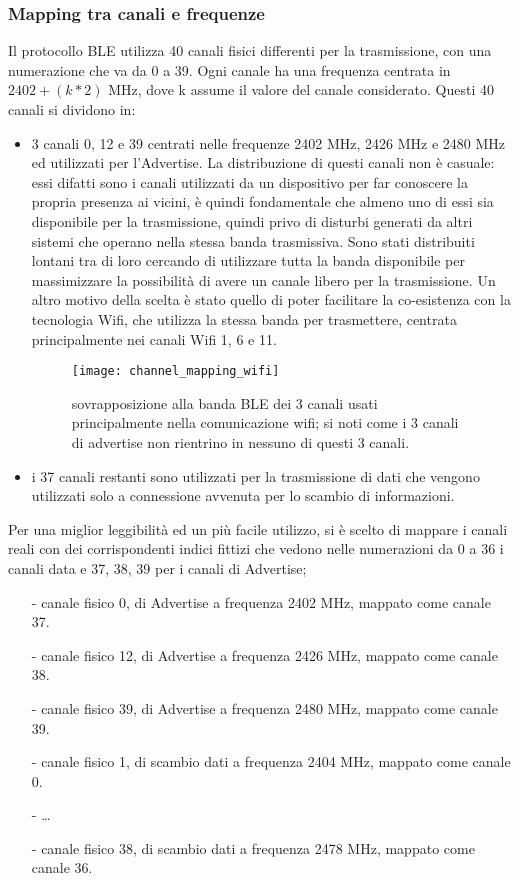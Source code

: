 \subsubsection{Mapping tra canali e frequenze}
Il protocollo BLE utilizza 40 canali fisici differenti per la trasmissione, con una numerazione che va da 0 a 39. Ogni canale ha una frequenza centrata in $2402 + (k * 2)$ MHz, dove k assume il valore del canale considerato.
Questi 40 canali si dividono in:
\begin{itemize}
\item 3 canali 0, 12 e 39 centrati nelle frequenze 2402 MHz, 2426 MHz e 2480 MHz ed utilizzati per l'Advertise. La distribuzione di questi canali non è casuale: essi difatti sono i canali utilizzati da un dispositivo per far conoscere la propria presenza ai vicini, è quindi fondamentale che almeno uno di essi sia disponibile per la trasmissione, quindi privo di disturbi generati da altri sistemi che operano nella stessa banda trasmissiva. Sono stati distribuiti lontani tra di loro cercando di utilizzare tutta la banda disponibile per massimizzare la possibilità di avere un canale libero per la trasmissione. Un altro motivo della scelta è stato quello di poter facilitare la co-esistenza con la tecnologia Wifi, che utilizza la stessa banda per trasmettere, centrata principalmente nei canali Wifi 1, 6 e 11.

\begin{figure}[H]
\texttt{[image: channel\_mapping\_wifi]}
\centering
\caption{sovrapposizione alla banda BLE dei 3 canali usati principalmente nella comunicazione wifi; si noti come i 3 canali di advertise non rientrino in nessuno di questi 3 canali.}
\end{figure}

\item i 37 canali restanti sono utilizzati per la trasmissione di dati che vengono utilizzati solo a connessione avvenuta per lo scambio di informazioni.
\end{itemize} 


Per una miglior leggibilità ed un più facile utilizzo, si è scelto di mappare i canali reali con dei corrispondenti indici fittizi che vedono nelle numerazioni da 0 a 36 i canali data e 37, 38, 39 per i canali di Advertise;
\begin{itemize}
\item[-] canale fisico 0, di Advertise a frequenza 2402 MHz, mappato come canale 37.
\item[-] canale fisico 12, di Advertise a frequenza 2426 MHz, mappato come canale 38.
\item[-] canale fisico 39, di Advertise a frequenza 2480 MHz, mappato come canale 39. 
\item[-] canale fisico 1, di scambio dati a frequenza 2404 MHz, mappato come canale 0.
\item[-] \dots
\item[-] canale fisico 38, di scambio dati a frequenza 2478 MHz, mappato come canale 36.
\end{itemize}

